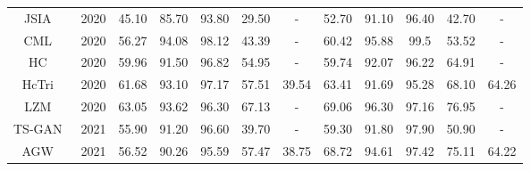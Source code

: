 \documentclass[journal]{IEEEtran}
\begin{document}
\begin{table*}[]
\begin{tabular}{c|c|ccccc|ccccc}
		JSIA~\cite{wang2020cross}                     & 2020                  & 45.10                       & 85.70                        & 93.80                        & 29.50                    & -              & 52.70                       & 91.10                        & 96.40                        & 42.70                    & -              \\
		CML~\cite{ling2020class}                      & 2020                  & 56.27                       & 94.08                        & 98.12                        & 43.39                    & -              & 60.42                       & 95.88                        & 99.5                         & 53.52                    & -              \\
		HC~\cite{zhu2020hetero}                       & 2020                  & 59.96                       & 91.50                        & 96.82                        & 54.95                    & -              & 59.74                       & 92.07                        & 96.22                        & 64.91                    & -              \\
		HcTri~\cite{liu2020parameter}                    & 2020                  & 61.68                       & 93.10                        & 97.17                        & 57.51                    & 39.54          & 63.41                       & 91.69                        & 95.28                        & 68.10                    & 64.26          \\
		LZM~\cite{basaran2020efficient}                       & 2020                  & 63.05                       & 93.62                        & 96.30                        & 67.13                    & -              & 69.06                       & 96.30                        & 97.16                        & 76.95                    & -              \\ \hline
		TS-GAN~\cite{zhang2021rgb}                    & 2021                  & 55.90                       & 91.20                        & 96.60                        & 39.70                    & -              & 59.30                       & 91.80                        & 97.90                        & 50.90                    & -              \\
		AGW~\cite{xia2021visible}                       & 2021                  & 56.52                       & 90.26                        & 95.59                        & 57.47                    & 38.75          & 68.72                       & 94.61                        & 97.42                        & 75.11                    & 64.22          \\

\end{tabular}
\end{table*}
\end{document}
